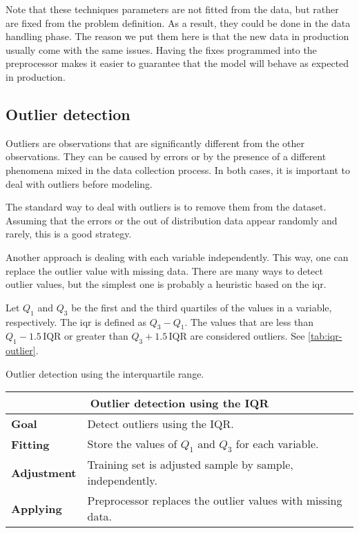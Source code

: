 Note that these techniques parameters are not fitted from the data, but rather are fixed
from the problem definition.  As a result, they could be done in the data handling phase.
The reason we put them here is that the new data in production usually come with the
same issues.  Having the fixes programmed into the preprocessor makes it easier to
guarantee that the model will behave as expected in production.

\subsection{Outlier detection}

Outliers are observations that are significantly different from the other observations.
They can be caused by errors or by the presence of a different phenomena mixed in the data
collection process.  In both cases, it is important to deal with outliers before modeling.

The standard way to deal with outliers is to remove them from the dataset.  Assuming that
the errors or the out of distribution data appear randomly and rarely, this is a good
strategy.

Another approach is dealing with each variable independently.  This way, one can replace
the outlier value with missing data.  There are many ways to detect outlier values, but
the simplest one is probably a heuristic based on the \gls{iqr}.

Let $Q_1$ and $Q_3$ be the first and the third quartiles of the values in a variable,
respectively.  The \gls{iqr} is defined as $Q_3 - Q_1$.  The values that are less than
$Q_1 - 1.5\, \text{IQR}$ or greater than $Q_3 + 1.5\, \text{IQR}$ are considered outliers.
See \cref{tab:iqr-outlier}.

\begin{tablebox}[label=tab:iqr-outlier]{Outlier detection using the interquartile range.}
  \centering
  \begin{tabular}{lp{6cm}}
    \toprule
    \multicolumn{2}{c}{\textbf{Outlier detection using the IQR}} \\
    \midrule
    \textbf{Goal} &
      Detect outliers using the IQR. \\
    \textbf{Fitting} &
      Store the values of $Q_1$ and $Q_3$ for each variable. \\
    \textbf{Adjustment} &
      Training set is adjusted sample by sample, independently. \\
    \textbf{Applying} &
      Preprocessor replaces the outlier values with missing data. \\
    \bottomrule
  \end{tabular}
\end{tablebox}

